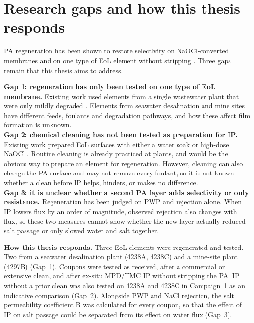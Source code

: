 \section{Research gaps and how this thesis responds}
\label{sec:research-gap}

PA regeneration has been shown to restore selectivity on NaOCl-converted membranes \citep{Ogbe2025} and on one type of EoL element without stripping \citep{Ogbe2026}. Three gaps remain that this thesis aims to address. 

\textbf{Gap 1: regeneration has only been tested on one type of EoL membrane.} Existing work used elements from a single wastewater plant that were only mildly degraded \citep{Ogbe2026}. Elements from seawater desalination and mine sites have different feeds, foulants and degradation pathways, and how these affect film formation is unknown.  \\

\textbf{Gap 2: chemical cleaning has not been tested as preparation for IP.} Existing work prepared EoL surfaces with either a water soak or high-dose NaOCl \citep{Ogbe2025,Ogbe2026}. Routine cleaning is already practiced at plants, and would be the obvious way to prepare an element for regeneration. However, cleaning can also change the PA surface and may not remove every foulant, so it is not known whether a clean before IP helps, hinders, or makes no difference. \\

\textbf{Gap 3: it is unclear whether a second PA layer adds selectivity or only resistance.} Regeneration has been judged on PWP and rejection alone. When IP lowers flux by an order of magnitude, observed rejection also changes with flux, so these two measures cannot show whether the new layer actually reduced salt passage or only slowed water and salt together. 

\textbf{How this thesis responds.} Three EoL elements were regenerated and tested. Two from a seawater desalination plant (4238A, 4238C) and a mine-site plant (4297B) (Gap~1). Coupons were tested as received, after a commercial or extensive clean, and after ex-situ MPD/TMC IP without stripping the PA. IP without a prior clean was also tested on 4238A and 4238C in Campaign~1 as an indicative comparison (Gap~2). Alongside PWP and NaCl rejection, the salt permeability coefficient B was calculated for every coupon, so that the effect of IP on salt passage could be separated from its effect on water flux (Gap~3).